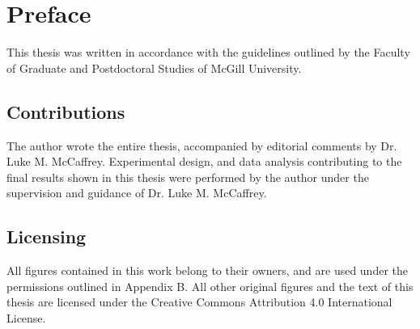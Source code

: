\newpage
\section*{Preface}
This thesis was written in accordance with the guidelines outlined by the Faculty of Graduate and Postdoctoral Studies of McGill University.
 
\subsection*{Contributions}
The author wrote the entire thesis, accompanied by editorial comments by Dr. Luke M. McCaffrey. Experimental design, and data analysis contributing to the final results shown in this thesis were performed by the author under the supervision and guidance of Dr. Luke M. McCaffrey.

\subsection*{Licensing}
All figures contained in this work belong to their owners, and are used under the permissions outlined in Appendix B. All other original figures and the text of this thesis are licensed under the Creative Commons Attribution 4.0 International License.